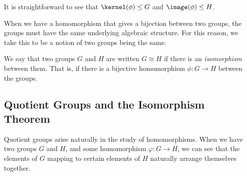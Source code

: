 \documentclass[a4paper]{scrartcl}
\begin{document}
It is straightforward to see that $\kernel(\phi) \leq G$ and $\image(\phi) \leq H$.

When we have a homomorphism that gives a bijection between two groups, the groups must have the same underlying algebraic structure. For this reason, we take this to be a notion of two groups being the same.

\begin{definition}[Isomorphism]
  We say that two groups $G$ and $H$ are  written $G \cong H$ if there is an \emph{isomorphism} between them. That is, if there is a bijective homomorphism $\phi: G \rightarrow H$ between the groups.  
\end{definition}



\subsection{Quotient Groups and the Isomorphism Theorem}


Quotient groups arise naturally in the study of homomorphisms. When we have two groups $G$ and $H$, and some homomorphism $\varphi: G \rightarrow H$, we can see that the elements of $G$ mapping to certain elements of $H$ naturally arrange themselves together.
\end{document}
